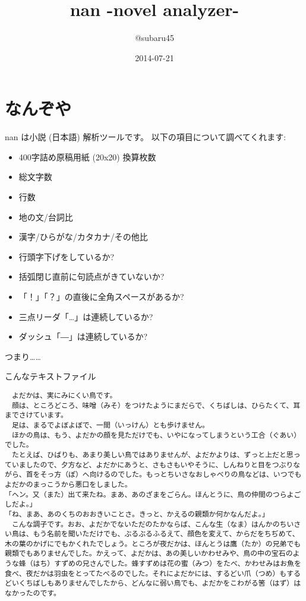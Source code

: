 \documentclass[a4j]{jsarticle}
\begin{document}
\title{nan -novel analyzer-}
\author{@subaru45}
\date{2014-07-21}
\maketitle


\section{なんぞや}
nan は小説 (日本語) 解析ツールです。
以下の項目について調べてくれます:

\begin{itemize}
  \item 400字詰め原稿用紙 (20x20) 換算枚数
  \item 総文字数
  \item 行数
  \item 地の文/台詞比
  \item 漢字/ひらがな/カタカナ/その他比
  \item 行頭字下げをしているか?
  \item 括弧閉じ直前に句読点がきていないか?
  \item 「！」「？」の直後に全角スペースがあるか?
  \item 三点リーダ「…」は連続しているか?
  \item ダッシュ「―」は連続しているか?
\end{itemize}

つまり……

こんなテキストファイル
\begin{lstlisting}[caption=yodaka.txt]
　よだかは、実にみにくい鳥です。
　顔は、ところどころ、味噌（みそ）をつけたようにまだらで、くちばしは、ひらたくて、耳までさけています。
　足は、まるでよぼよぼで、一間（いっけん）とも歩けません。
　ほかの鳥は、もう、よだかの顔を見ただけでも、いやになってしまうという工合（ぐあい）でした。
　たとえば、ひばりも、あまり美しい鳥ではありませんが、よだかよりは、ずっと上だと思っていましたので、夕方など、よだかにあうと、さもさもいやそうに、しんねりと目をつぶりながら、首をそっ方（ぽ）へ向けるのでした。もっとちいさなおしゃべりの鳥などは、いつでもよだかのまっこうから悪口をしました。
「ヘン。又（また）出て来たね。まあ、あのざまをごらん。ほんとうに、鳥の仲間のつらよごしだよ。」
「ね、まあ、あのくちのおおきいことさ。きっと、かえるの親類か何かなんだよ。」
　こんな調子です。おお、よだかでないただのたかならば、こんな生（なま）はんかのちいさい鳥は、もう名前を聞いただけでも、ぶるぶるふるえて、顔色を変えて、からだをちぢめて、木の葉のかげにでもかくれたでしょう。ところが夜だかは、ほんとうは鷹（たか）の兄弟でも親類でもありませんでした。かえって、よだかは、あの美しいかわせみや、鳥の中の宝石のような蜂（はち）すずめの兄さんでした。蜂すずめは花の蜜（みつ）をたべ、かわせみはお魚を食べ、夜だかは羽虫をとってたべるのでした。それによだかには、するどい爪（つめ）もするどいくちばしもありませんでしたから、どんなに弱い鳥でも、よだかをこわがる筈（はず）はなかったのです。
\end{lstlisting}
\end{document}
